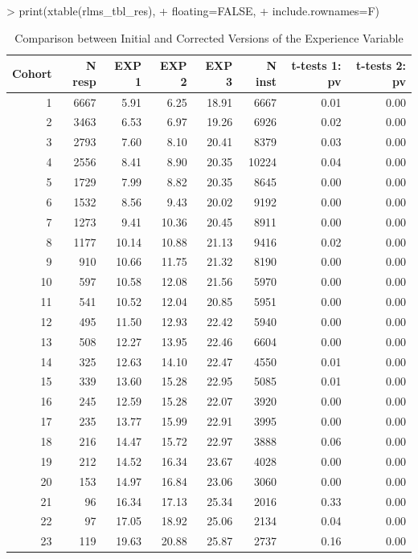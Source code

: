 \documentclass[12pt,a4paper]{article}
\begin{document}
\begin{table}[H]
        \centering
        \caption{Comparison between Initial and Corrected Versions of the Experience Variable}
        \label{tab:1}
\begin{Schunk}
\begin{Sinput}
> print(xtable(rlms_tbl_res),
+   floating=FALSE,
+   include.rownames=F)
\end{Sinput}
\begin{tabular}{rrrrrrrr}
  \hline
Cohort & N resp & EXP 1 & EXP 2 & EXP 3 & N inst & t-tests 1: pv & t-tests 2: pv \\ 
  \hline
  1 & 6667 & 5.91 & 6.25 & 18.91 & 6667 & 0.01 & 0.00 \\ 
    2 & 3463 & 6.53 & 6.97 & 19.26 & 6926 & 0.02 & 0.00 \\ 
    3 & 2793 & 7.60 & 8.10 & 20.41 & 8379 & 0.03 & 0.00 \\ 
    4 & 2556 & 8.41 & 8.90 & 20.35 & 10224 & 0.04 & 0.00 \\ 
    5 & 1729 & 7.99 & 8.82 & 20.35 & 8645 & 0.00 & 0.00 \\ 
    6 & 1532 & 8.56 & 9.43 & 20.02 & 9192 & 0.00 & 0.00 \\ 
    7 & 1273 & 9.41 & 10.36 & 20.45 & 8911 & 0.00 & 0.00 \\ 
    8 & 1177 & 10.14 & 10.88 & 21.13 & 9416 & 0.02 & 0.00 \\ 
    9 & 910 & 10.66 & 11.75 & 21.32 & 8190 & 0.00 & 0.00 \\ 
   10 & 597 & 10.58 & 12.08 & 21.56 & 5970 & 0.00 & 0.00 \\ 
   11 & 541 & 10.52 & 12.04 & 20.85 & 5951 & 0.00 & 0.00 \\ 
   12 & 495 & 11.50 & 12.93 & 22.42 & 5940 & 0.00 & 0.00 \\ 
   13 & 508 & 12.27 & 13.95 & 22.46 & 6604 & 0.00 & 0.00 \\ 
   14 & 325 & 12.63 & 14.10 & 22.47 & 4550 & 0.01 & 0.00 \\ 
   15 & 339 & 13.60 & 15.28 & 22.95 & 5085 & 0.01 & 0.00 \\ 
   16 & 245 & 12.59 & 15.28 & 22.07 & 3920 & 0.00 & 0.00 \\ 
   17 & 235 & 13.77 & 15.99 & 22.91 & 3995 & 0.00 & 0.00 \\ 
   18 & 216 & 14.47 & 15.72 & 22.97 & 3888 & 0.06 & 0.00 \\ 
   19 & 212 & 14.52 & 16.34 & 23.67 & 4028 & 0.00 & 0.00 \\ 
   20 & 153 & 14.97 & 16.84 & 23.06 & 3060 & 0.00 & 0.00 \\ 
   21 &  96 & 16.34 & 17.13 & 25.34 & 2016 & 0.33 & 0.00 \\ 
   22 &  97 & 17.05 & 18.92 & 25.06 & 2134 & 0.04 & 0.00 \\ 
   23 & 119 & 19.63 & 20.88 & 25.87 & 2737 & 0.16 & 0.00 \\ 
   \hline
\end{tabular}\end{Schunk}
\end{table}
\end{document}
